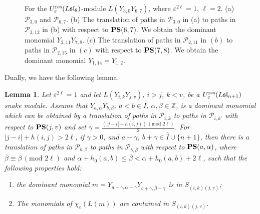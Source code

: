 \documentclass[12pt, reqno]{amsart}
\newtheorem{lemma}[theorem]{Lemma}
\numberwithin{equation}{section}
\newcommand{\res}{{\rm res}}
\begin{document}
{\begin{figure}
{\begin{minipage}[b]{0.4\linewidth}
{}
\end{minipage}}
\caption{For the $U_{\varepsilon}^{\res}({L\mathfrak{sl}_{8}})$-module $L(Y_{3,0}Y_{6,7})$, where $\varepsilon^{2 \ell}=1$, $\ell=2$. (a) $\mathscr{P}_{3,0}$ and $\mathscr{P}_{6,7}$. (b) The translation of paths in $\mathscr{P}_{3,0}$ in (a) to paths in $\mathscr{P}_{3,12}$ in (b) with respect to ${\bf PS}(6,7)$. We obtain the dominant monomial $Y_{2,11}Y_{7,8}$. (c) The translation of paths in $\mathscr{P}_{2,11}$ in $(b)$ to paths in $\mathscr{P}_{2,15}$ in $(c)$ with respect to ${\bf PS}(7,8)$. We obtain the dominant monomial $Y_{1,14}=Y_{1,2}$.}\label{F:  two translations}
\end{figure}

Dually, we have the following lemma.

\begin{lemma}\label{Le: dual two translations}
Let $\varepsilon^{2 \ell}=1$ and let $L(Y_{i,k}Y_{j,v})$, $i>j$, $k<v$, be a $U_{\varepsilon}^{\res}({L\mathfrak{sl}_{n+1}})$ snake module. Assume that $Y_{a,\alpha}Y_{b,\beta}$, $a< b \in I$, $\alpha, \beta \in \mathbb{Z}$, is a dominant monomial which can be obtained by a translation of paths in $\mathscr{P}_{i,k}$ to paths in $\mathscr{P}_{i,k'}$ with respect to ${\bf PS}(j,v)$ and set $\gamma=\frac{(|j-i|+h(i,j))\,(\text{mod } 2 \ell)}2$. For $|j-i|+h(i,j)>2 \ell$, if $\gamma>0$, and $a-\gamma$, $b+\gamma\in \hat{I}\cup\{n+1\}$, then there is a translation of paths in $\mathscr{P}_{b,\beta}$ to paths in $\mathscr{P}_{b,\overline{\beta}}$ with respect to ${\bf PS}(a,\alpha)$, where $\overline{\beta}\equiv \beta\, (\text{mod } 2 \ell)$ and $\alpha+h_0(a,b)\leq \overline{\beta}< \alpha+h_0(a,b)+2 \ell$, such that the following properties hold:
\begin{enumerate}
\item the dominant monomial $m=Y_{a-\gamma,\alpha+\gamma}Y_{b+\gamma,\overline{\beta}-\gamma}$ is in $S_{(i,k)(j,v)}$;
\item The monomials of $\chi_\varepsilon(L(m))$ are contained in $S_{(i,k)(j,v)}$.
\end{enumerate}
\end{lemma}


}
\end{document}
